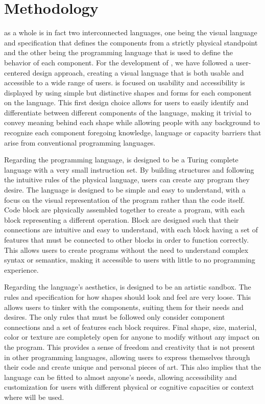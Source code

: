 \section{Methodology}
\label{sec:methodology}

\sculpt as a whole is in fact two interconnected languages, one being the visual language and specification that defines the components from a strictly physical standpoint and the other being the programming language that is used to define the behavior of each component.
For the development of \sculpt, we have followed a user-centered design approach, creating a visual language that is both usable and accessible to a wide range of users.
\sculpt is focused on usability and accessibility is displayed by using simple but distinctive shapes and forms for each component on the language.
This first design choice allows for users to easily identify and differentiate between different components of the language, making it trivial to convey meaning behind each shape while allowing people with any background to recognize each component foregoing knowledge, language or capacity barriers that arise from conventional programming languages.

Regarding the programming language, \sculpt is designed to be a Turing complete language with a very small instruction set.
By building structures and following the intuitive rules of the physical language, users can create any program they desire.
The language is designed to be simple and easy to understand, with a focus on the visual representation of the program rather than the code itself.
Code block are physically assembled together to create a program, with each block representing a different operation. Block are designed such that their connections are intuitive and easy to understand, with each block having a set of features that must be connected to other blocks in order to function correctly.
This allows users to create programs without the need to understand complex syntax or semantics, making it accessible to users with little to no programming experience.


Regarding the language's aesthetics, \sculpt is designed to be an artistic sandbox. The rules and specification for how shapes should look and feel are very loose. This allows users to tinker with the components, suiting them for their needs and desires.
The only rules that must be followed only consider component connections and a set of features each block requires. Final shape, size, material, color or texture are completely open for anyone to modify without any impact on the program.
This provides a sense of freedom and creativity that is not present in other programming languages, allowing users to express themselves through their code and create unique and personal pieces of art.
This also implies that the language can be fitted to almost anyone's needs, allowing accessibility and customization for users with different physical or cognitive capacities or context where \sculpt will be used.


